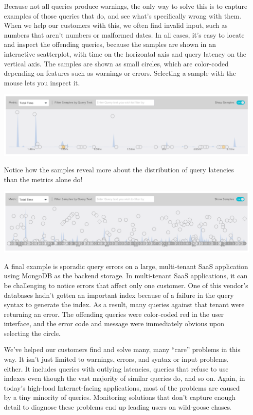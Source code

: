 \documentclass{vivid_layout}
\begin{document}
Because not all queries produce warnings, the only way to solve this is to
capture examples of those queries that do, and see what's specifically wrong with
them. When we help our customers with this, we often find invalid input, such as
numbers that aren't numbers or malformed dates. In all cases, it's easy to
locate and inspect the offending queries, because the samples are shown in an
interactive scatterplot, with time on the horizontal axis and query latency on
the vertical axis. The samples are shown as small circles, which are color-coded
depending on features such as warnings or errors. Selecting a sample with the
mouse lets you inspect it.

\begin{center}
\includegraphics[width=.85\linewidth]{sketch-sampling/warnings}
\end{center}

Notice how the samples reveal more about the distribution of query latencies
than the metrics alone do!

\begin{center}
\includegraphics[width=.85\linewidth]{sketch-sampling/distribution}
\end{center}

A final example is sporadic query errors on a large, multi-tenant SaaS
application using MongoDB as the backend storage. In multi-tenant SaaS
applications, it can be challenging to notice errors that affect only one
customer. One of this vendor's databases hadn't gotten an important index
because of a failure in the query syntax to generate the index.  As a result,
many queries against that tenant were returning an error. The offending queries
were color-coded red in the user interface, and the error code and message were
immediately obvious upon selecting the circle.

We've helped our customers find and solve many, many ``rare'' problems in this
way. It isn't just limited to warnings, errors, and syntax or input problems,
either. It includes queries with outlying latencies, queries that refuse to use
indexes even though the vast majority of similar queries do, and so on. Again,
in today's high-load Internet-facing applications, most of the problems are
caused by a tiny minority of queries. Monitoring solutions that don't capture
enough detail to diagnose these problems end up leading users on wild-goose
chases.
\end{document}
